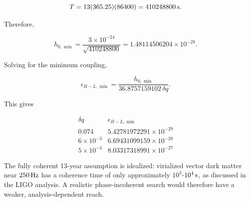 \[
T=13(365.25)(86400) =410248800\,{\rm s}.
\]

Therefore,

\[
h_{0,\min} =\frac{3\times10^{-24}}{\sqrt{410248800}} =1.48114506204\times10^{-28}.
\]

Solving for the minimum coupling,

\[
\epsilon_{B-L,\min} =\frac{h_{0,\min}} {36.8757159102\,\delta q}.
\]

This gives

\[
\begin{array}{c|c}
\delta q & \epsilon_{B-L,\min}\\
\hline
0.074 & 5.42781972291\times10^{-29}\\
6\times10^{-3} & 6.69431099159\times10^{-28}\\
5\times10^{-4} & 8.03317318991\times10^{-27}
\end{array}
\]

The fully coherent 13-year assumption is idealized: virialized vector dark matter near $250\,{\rm Hz}$ has a coherence time of only approximately $10^3$-$10^4\,{\rm s}$, as discussed in the LIGO analysis. A realistic phase-incoherent search would therefore have a weaker, analysis-dependent reach.
